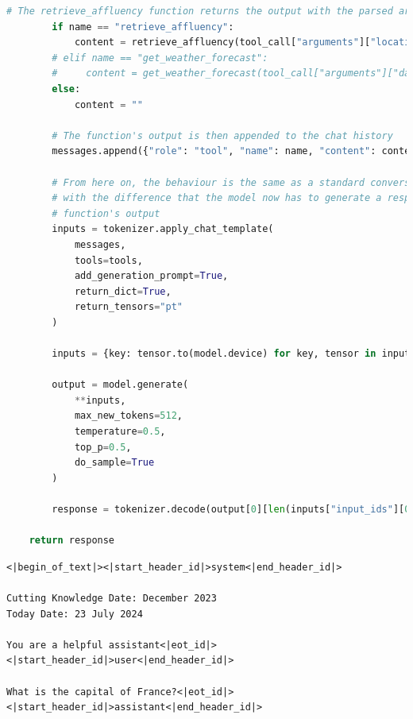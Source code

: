\begin{center}
\begin{lstlisting}[language=Python, frame=single, caption=\texttt{generate\_response()} Function.]
        # The retrieve_affluency function returns the output with the parsed arguments
        if name == "retrieve_affluency":
            content = retrieve_affluency(tool_call["arguments"]["location"], tool_call["arguments"]["date"])
        # elif name == "get_weather_forecast":
        #     content = get_weather_forecast(tool_call["arguments"]["date"])
        else:
            content = ""

        # The function's output is then appended to the chat history
        messages.append({"role": "tool", "name": name, "content": content})

        # From here on, the behaviour is the same as a standard conversation,
        # with the difference that the model now has to generate a response based on the 
        # function's output
        inputs = tokenizer.apply_chat_template(
            messages,
            tools=tools,
            add_generation_prompt=True,
            return_dict=True,
            return_tensors="pt"
        )

        inputs = {key: tensor.to(model.device) for key, tensor in inputs.items()}

        output = model.generate(
            **inputs,
            max_new_tokens=512,
            temperature=0.5,
            top_p=0.5,
            do_sample=True
        )

        response = tokenizer.decode(output[0][len(inputs["input_ids"][0]):], skip_special_tokens=True)

    return response
\end{lstlisting}
\end{center}


\begin{Verbatim}[breaklines=true]
<|begin_of_text|><|start_header_id|>system<|end_header_id|>

Cutting Knowledge Date: December 2023
Today Date: 23 July 2024
    
You are a helpful assistant<|eot_id|><|start_header_id|>user<|end_header_id|>
    
What is the capital of France?<|eot_id|><|start_header_id|>assistant<|end_header_id|>
\end{Verbatim}

